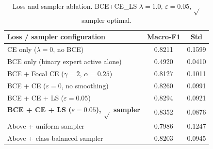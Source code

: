 \begin{table}[t]
\centering
\small
\caption{Loss and sampler ablation. BCE+CE\_LS $\lambda=1.0$, $\varepsilon=0.05$, $\sqrt{}$ sampler optimal.}
\label{tab:loss_sampler_ablation}
\begin{tabular}{lcc}
\toprule
\textbf{Loss / sampler configuration} & \textbf{Macro-F1} & \textbf{Std} \\
\midrule
CE only ($\lambda=0$, no BCE) & 0.8211 & 0.1599 \\
BCE only (binary expert active alone) & 0.4920 & 0.0410 \\
BCE + Focal CE ($\gamma=2$, $\alpha=0.25$) & 0.8127 & 0.1011 \\
BCE + CE ($\varepsilon=0$, no smoothing) & 0.8260 & 0.0991 \\
BCE + CE + LS ($\varepsilon=0.05$) & 0.8294 & 0.0921 \\
\textbf{BCE + CE + LS ($\varepsilon=0.05$), $\sqrt{}$ sampler} & 0.8352 & 0.0876 \\
Above + uniform sampler & 0.7986 & 0.1247 \\
Above + class-balanced sampler & 0.8203 & 0.0945 \\
\bottomrule
\end{tabular}
\end{table}
